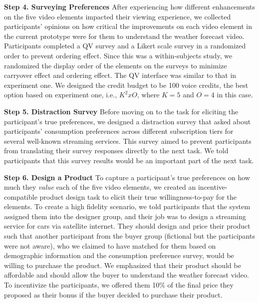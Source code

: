 \textbf{Step 4. Surveying Preferences} After experiencing how different enhancements on the five video elements impacted their viewing experience, we collected participants' opinions on how critical the improvements on each video element in the current prototype were for them to understand the weather forecast video. Participants completed  a QV survey and a Likert scale survey in a randomized order to prevent ordering effect. Since this was a within-subjects study, we randomized the display order of the elements on the surveys to minimize carryover effect and ordering effect. The QV interface was similar to that in experiment one. We designed the credit budget to be 100 voice credits, the best option based on experiment one, i.e., $K^2 x O$, where $K=5$ and $O=4$ in this case.

\textbf{Step 5. Distraction Survey} Before moving on to the task for eliciting the participant's true preferences, we designed a distraction survey that asked about participants' consumption preferences across different subscription tiers for several well-known streaming services. This survey aimed to prevent participants from translating their survey responses directly to the next task. We told participants that this survey results would be an important part of the next task.

\textbf{Step 6. Design a Product} To capture a participant's true preferences on how much they \textit{value} each of the five video elements, we created an incentive-compatible product design task to elicit their true willingness-to-pay for the elements. To create a high fidelity scenario, we told participants that the system assigned them into the designer group, and their job was to design a streaming service for cars via satellite internet. They should design and price their product such that another participant from the buyer group (fictional but the participants were not aware), who we claimed to have matched for them based on demographic information and the consumption preference survey, would be willing to purchase the product. We emphasized that their product should be affordable and should allow the buyer to understand the weather forecast video. To incentivize the participants, we offered them 10\% of the final price they proposed as their bonus if the buyer decided to purchase their product.


